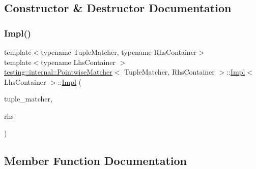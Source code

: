 \subsection{Constructor \& Destructor Documentation}
\mbox{\label{classtesting_1_1internal_1_1_pointwise_matcher_1_1_impl_aaf6841b254ef78395919dfc5705dd152}} 
\subsubsection{\texorpdfstring{Impl()}{Impl()}}
{\footnotesize\ttfamily template$<$typename Tuple\+Matcher, typename Rhs\+Container$>$ \\
template$<$typename Lhs\+Container $>$ \\
\hyperlink{classtesting_1_1internal_1_1_pointwise_matcher}{testing\+::internal\+::\+Pointwise\+Matcher}$<$ Tuple\+Matcher, Rhs\+Container $>$\+::\hyperlink{classtesting_1_1internal_1_1_pointwise_matcher_1_1_impl}{Impl}$<$ Lhs\+Container $>$\+::\hyperlink{classtesting_1_1internal_1_1_pointwise_matcher_1_1_impl}{Impl} (\begin{DoxyParamCaption}\item[{const Tuple\+Matcher \&}]{tuple\+\_\+matcher,  }\item[{const \hyperlink{classtesting_1_1internal_1_1_pointwise_matcher_aadbaec8c93351f29b103816c2e397edd}{Rhs\+Stl\+Container} \&}]{rhs }\end{DoxyParamCaption})\hspace{0.3cm}{\ttfamily [inline]}}



\subsection{Member Function Documentation}
\mbox{\label{classtesting_1_1internal_1_1_pointwise_matcher_1_1_impl_a26d3a829149e4c497aaced42aad7b247}} 
